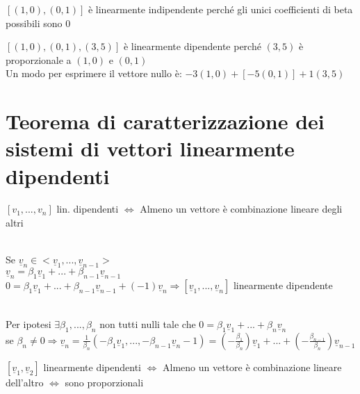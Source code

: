 \begin{es}
	$[(1,0),(0,1)]$ è linearmente indipendente perché gli unici coefficienti di beta possibili sono 0
\end{es}

\begin{es}
	$[(1,0),(0,1),(3,5)]$ è linearmente dipendente perché $(3,5)$ è proporzionale a $(1,0)$ e $(0,1)$\\
	Un modo per esprimere il vettore nullo è: $-3(1,0)+[-5(0,1)]+1(3,5)$
\end{es}

\section{Teorema di caratterizzazione dei sistemi di vettori linearmente dipendenti}

\begin{teorema}\label{caratterizzazione}
	$[v_1,...,v_n]$ lin. dipendenti $\Longleftrightarrow $ Almeno un vettore è combinazione lineare degli altri\\
	\begin{dimostrazione}
		\phantom{}\\
		Se $\underline{v}_n\in <\underline{v}_1,...,\underline{v}_{n-1}>$\\
		$\underline{v}_n=\beta_1 \underline{v}_1+...+\beta_{n-1} \underline{v}_{n-1}$\\
		$0=\beta_1 \underline{v}_1+...+\beta_{n-1}\underline{v}_{n-1}+(-1)\underline{v}_n \Longrightarrow [\underline{v}_1,...,\underline{v}_n]$ linearmente dipendente 
	\end{dimostrazione}
	\begin{dimostrazione}
		\phantom{}\\
		Per ipotesi $\exists\beta_1,...,\beta_n$ non tutti nulli tale che $0=\beta_1 \underline{v}_1+...+\beta_n \underline{v}_n$\\
		se $\beta_n\neq 0\Longrightarrow  \underline{v}_n=\frac{1}{\beta_n}(-\beta_1 \underline{v}_1,...,-\beta_{n-1}\underline{v}_n-1)=(-\frac{\beta_1}{\beta_n})\underline{v}_1+...+(-\frac{\beta_{n-1}}{\beta_n})\underline{v}_{n-1}$
	\end{dimostrazione}
\end{teorema}

\begin{corollario}
	$[\underline{v}_1,\underline{v}_2]$ linearmente dipendenti $\Longleftrightarrow$ Almeno un vettore è combinazione lineare dell'altro $\Longleftrightarrow $ sono proporzionali
\end{corollario}

